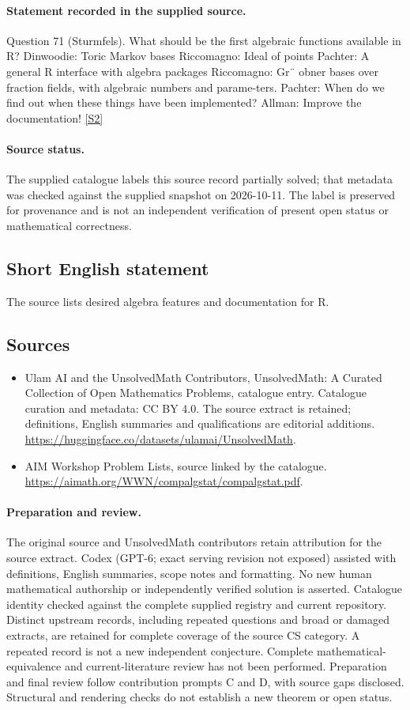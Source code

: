 \documentclass[11pt]{article}
\begin{document}
\paragraph{Statement recorded in the supplied source.}
Question 71 (Sturmfels). What should be the first algebraic functions available in R? Dinwoodie: Toric Markov bases Riccomagno: Ideal of points Pachter: A general R interface with algebra packages Riccomagno: Gr¨ obner bases over fraction fields, with algebraic numbers and parame-ters. Pachter: When do we find out when these things have been implemented? Allman: Improve the documentation! \href{https://aimath.org/WWN/compalgstat/compalgstat.pdf}{[S2]}
\paragraph{Source status.}
The supplied catalogue labels this source record partially solved; that metadata was checked against the supplied snapshot on 2026-10-11. The label is preserved for provenance and is not an independent verification of present open status or mathematical correctness.
\subsection{Short English statement}
The source lists desired algebra features and documentation for R.
\subsection{Sources}
\begin{itemize}
\item[S1] Ulam AI and the UnsolvedMath Contributors, UnsolvedMath: A Curated Collection of Open Mathematics Problems, catalogue entry. Catalogue curation and metadata: CC BY 4.0. The source extract is retained; definitions, English summaries and qualifications are editorial additions.
\url{https://huggingface.co/datasets/ulamai/UnsolvedMath}.
\item[S2] AIM Workshop Problem Lists, source linked by the catalogue.
\url{https://aimath.org/WWN/compalgstat/compalgstat.pdf}.
\end{itemize}
\paragraph{Preparation and review.}
The original source and UnsolvedMath contributors retain attribution for the source extract. Codex (GPT-6; exact serving revision not exposed) assisted with definitions, English summaries, scope notes and formatting. No new human mathematical authorship or independently verified solution is asserted. Catalogue identity checked against the complete supplied registry and current repository. Distinct upstream records, including repeated questions and broad or damaged extracts, are retained for complete coverage of the source CS category. A repeated record is not a new independent conjecture. Complete mathematical-equivalence and current-literature review has not been performed. Preparation and final review follow contribution prompts C and D, with source gaps disclosed. Structural and rendering checks do not establish a new theorem or open status.
\label{end:statement}
\end{document}
